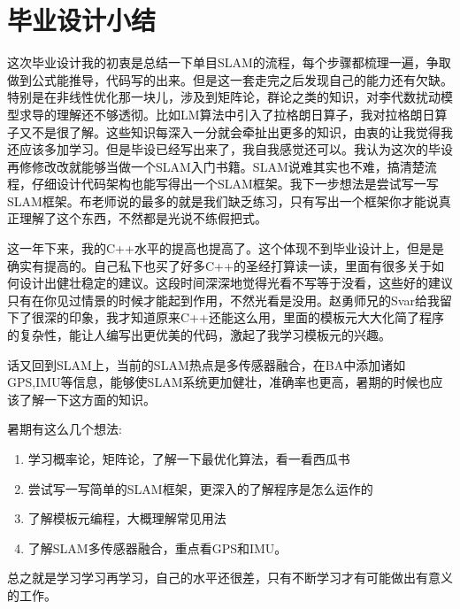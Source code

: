 \chapter*{毕业设计小结}
这次毕业设计我的初衷是总结一下单目SLAM的流程，每个步骤都梳理一遍，争取做到公式能推导，代码写的出来。但是这一套走完之后发现自己的能力还有欠缺。特别是在非线性优化那一块儿，涉及到矩阵论，群论之类的知识，对李代数扰动模型求导的理解还不够透彻。比如LM算法中引入了拉格朗日算子，我对拉格朗日算子又不是很了解。这些知识每深入一分就会牵扯出更多的知识，由衷的让我觉得我还应该多加学习。但是毕设已经写出来了，我自我感觉还可以。我认为这次的毕设再修修改改就能够当做一个SLAM入门书籍。SLAM说难其实也不难，搞清楚流程，仔细设计代码架构也能写得出一个SLAM框架。我下一步想法是尝试写一写SLAM框架。布老师说的最多的就是我们缺乏练习，只有写出一个框架你才能说真正理解了这个东西，不然都是光说不练假把式。\par
这一年下来，我的C++水平的提高也提高了。这个体现不到毕业设计上，但是是确实有提高的。自己私下也买了好多C++的圣经打算读一读，里面有很多关于如何设计出健壮稳定的建议。这段时间深深地觉得光看不写等于没看，这些好的建议只有在你见过情景的时候才能起到作用，不然光看是没用。赵勇师兄的Svar给我留下了很深的印象，我才知道原来C++还能这么用，里面的模板元大大化简了程序的复杂性，能让人编写出更优美的代码，激起了我学习模板元的兴趣。\par
话又回到SLAM上，当前的SLAM热点是多传感器融合，在BA中添加诸如GPS,IMU等信息，能够使SLAM系统更加健壮，准确率也更高，暑期的时候也应该了解一下这方面的知识。\par
暑期有这么几个想法:
\begin{enumerate}
\item 学习概率论，矩阵论，了解一下最优化算法，看一看西瓜书
\item 尝试写一写简单的SLAM框架，更深入的了解程序是怎么运作的
\item 了解模板元编程，大概理解常见用法
\item 了解SLAM多传感器融合，重点看GPS和IMU。
\end{enumerate}\par
总之就是学习学习再学习，自己的水平还很差，只有不断学习才有可能做出有意义的工作。